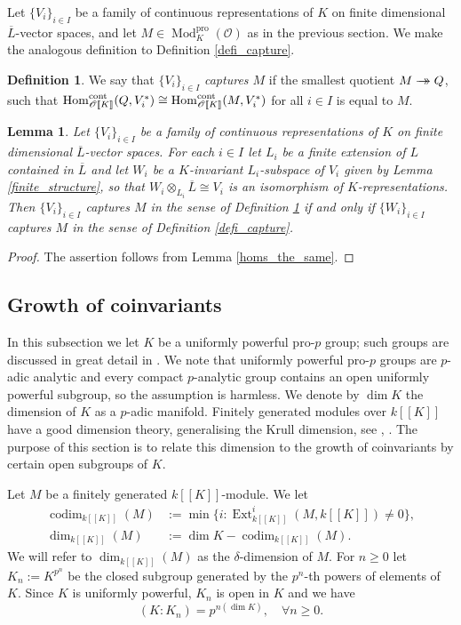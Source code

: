 \documentclass[JEP,XML,SOM,Unicode,NoEqCountersInSection]{cedram}
\let\mathcal\mathscr
\newcommand{\onto}{\mathchoice{\to\hspace*{-5mm}\to}{\to\hspace*{-2.85mm}\to}{\to\hspace*{-3mm}\to}{\to\hspace*{-3mm}\to}}
\newtheorem{lem}[prop]{Lemma}
\theoremstyle{definition}
\newtheorem{defi}[prop]{Definition}
\DeclareMathOperator{\Hom}{Hom}
\DeclareMathOperator{\codim}{codim}
\DeclareMathOperator{\Mod}{Mod}
\DeclareMathOperator{\Ext}{Ext}
\newcommand{\br}[1]{[\![#1]\!]}
\newcommand{\cO}{\mathcal{O}}
\newcommand{\Lbar}{\overline{L}}
\begin{document}
Let $\{V_i\}_{i\in I}$ be a family of
continuous representations
of $K$ on finite dimensional $\Lbar$-vector spaces, and let $M\in \Mod^{\mathrm{pro}}_K(\cO)$ as in the previous section.
We make the analogous definition to Definition \ref{defi_capture}.
\begin{defi}\label{capture_alg} We say
that $\{V_i\}_{i\in I}$ \textit{captures $M$} if the smallest quotient
$M\onto Q$, such that
$\Hom_{\cO\br{K}}^{\rm cont}(Q, V_i^*)\cong \Hom_{\cO\br{K}}^{\rm cont}(M, V_i^*)$ for all $i\in I$ is equal to $M$.
\end{defi}

\begin{lem} Let $\{V_i\}_{i\in I}$ be a family of continuous representations of $K$ on finite dimensional $\Lbar$-vector spaces. For each $i\in I$ let $L_i$ be a finite extension of $L$ contained in $\Lbar$ and let $W_i$ be a $K$-invariant
$L_i$-subspace of $V_i$ given by Lemma \ref{finite_structure}, so that $W_i\otimes_{L_i} \Lbar \cong V_i$ is an isomorphism of $K$-representations. Then $\{V_i\}_{i\in I}$ captures $M$ in the sense of Definition \ref{capture_alg} if and
only if $\{W_i\}_{i\in I}$ captures $M$ in the sense of Definition \ref{defi_capture}.
\end{lem}

\begin{proof} The assertion follows from Lemma \ref{homs_the_same}.
\end{proof}

\subsection{Growth of coinvariants}\label{sec_growth}

In this subsection we let $K$ be a uniformly powerful pro-$p$ group; such groups are discussed in great detail in \cite[\S 4]{analytic}. We note that uniformly powerful pro-$p$ groups are $p$-adic analytic and every compact $p$-analytic group contains an open uniformly powerful subgroup, so the assumption is harmless. We denote by $\dim K$ the dimension of $K$ as a $p$-adic manifold. Finitely generated modules over $k\br{K}$ have a good dimension theory,
generalising the Krull dimension, see \cite{ardakov_brown}, \cite{venjakob}. The purpose of this section is to relate this dimension to the growth of coinvariants by certain open
subgroups of $K$.

Let $M$ be a finitely generated $k\br{K}$-module. We let
\begin{align*}
\codim_{k\br{K}}(M)&:= \min\{i: \Ext^i_{k\br{K}}(M, k\br{K})\neq 0\},
\\
\dim_{k\br{K}}(M)&:= \dim K-\codim_{k\br{K}}(M).
\end{align*}
We will refer to $\dim_{k\br{K}}(M)$ as the $\delta$-dimension of $M$. For $n\ge 0$ let $K_n:=K^{p^n}$ be the closed subgroup generated by the $p^n$-th powers of elements of $K$. Since $K$ is uniformly powerful, $K_n$ is open in $K$ and we have
\begin{equation}\label{index_pro_p}
(K:K_n)= p^{n(\dim K)}, \quad \forall n\ge 0.
\end{equation}
\end{document}
